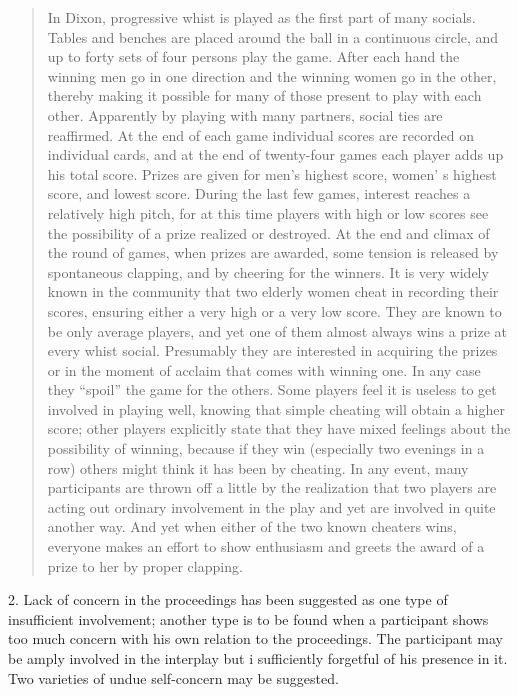\documentclass[openany,nobib]{tufte-book}
\begin{document}
\begin{quote}
In Dixon, progressive whist is played as the first part of many socials.
Tables and benches are placed around the ball in a continuous circle,
and up to forty sets of four persons play the game. After each hand the
winning men go in one direction and the winning women go in the other,
thereby making it possible for many of those present to play with each
other. Apparently by playing with many partners, social ties are
reaffirmed. At the end of each game individual scores are recorded on
individual cards, and at the end of twenty-four games each player adds
up his total score. Prizes are given for men's highest score, women' s
highest score, and lowest score. During the last few games, interest
reaches a relatively high pitch, for at this time players with high or
low scores see the possibility of a prize realized or destroyed. At the
end and climax of the round of games, when prizes are awarded, some
tension is released by spontaneous clapping, and by cheering for the
winners. It is very widely known in the community that two elderly women
cheat in recording their scores, ensuring either a very high or a very
low score. They are known to be only average players, and yet one of
them almost always wins a prize at every whist social. Presumably they
are interested in acquiring the prizes or in the moment of acclaim that
comes with winning one. In any case they ``spoil'' the game for the
others. Some players feel it is useless to get involved in playing well,
knowing that simple cheating will obtain a higher score; other players
explicitly state that they have mixed feelings about the possibility of
winning, because if they win (especially two evenings in a row) others
might think it has been by cheating. In any event, many participants are
thrown off a little by the realization that two players are acting out
ordinary involvement in the play and yet are involved in quite another
way. And yet when either of the two known cheaters wins, everyone makes
an effort to show enthusiasm and greets the award of a prize to her by
proper clapping.
\end{quote}

2. Lack of concern in the proceedings has been suggested as one type of
insufficient involvement; another type is to be found when a participant
shows too much concern with his own relation to the proceedings. The
participant may be amply involved in the interplay but i sufficiently
forgetful of his presence in it. Two varieties of undue self-concern may
be suggested.
\end{document}
